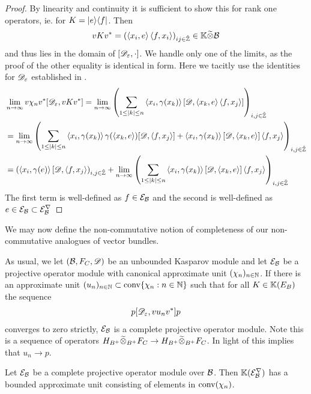\begin{proof}
	By linearity and continuity it is sufficient to show this for rank one operators, ie. for $K=\lvert e \rangle\langle f \rvert$. Then
	\begin{align*}
		vKv^*=(\left \langle x_i,e \right \rangle\left \langle f,x_i \right \rangle)_{ij\in \hat{\mathbb{Z}}}\in \mathbb{K}\widetilde{\otimes} \mathcal{B}
	\end{align*}
	and thus lies in the domain of $[\mathscr{D}_\varepsilon,\cdot]$. We handle only one of the limits, as the proof of the other equality is identical in form. Here we tacitly use the identities for $\mathscr{D}_\varepsilon$ established in .
	\begin{align*}
		&\lim_{n\to \infty} v\chi_nv^* [\mathscr{D}_\varepsilon,vKv^*]=\lim_{n\to \infty} \left ( \sum_{1\leq |k|\leq n}\left \langle x_i,\gamma(x_k) \right \rangle[\mathscr{D},\left \langle x_k,e \right \rangle\left \langle f,x_j \right \rangle] \right )_{i,j\in \hat{\mathbb{Z}}} \\ 
		&=\lim_{n\to \infty} \left ( \sum_{1\leq |k|\leq n } \left \langle x_i,\gamma(x_k) \right \rangle\gamma(\left \langle x_k,e \right \rangle)[\mathscr{D},\left \langle f,x_j \right \rangle]+\left \langle x_i,\gamma(x_k) \right \rangle[\mathscr{D},\left \langle x_k,e \right \rangle]\left \langle f,x_j \right \rangle \right )_{i,j\in \hat{\mathbb{Z}}} \\		
		&=(\left \langle x_i,\gamma(e) \right \rangle[\mathscr{D},\left \langle f,x_j \right \rangle)_{i,j \in \hat{\mathbb{Z}}} +\lim_{n\to \infty} \left ( \sum_{1\leq |k|\leq n} \left \langle x_i,\gamma(x_k) \right \rangle[\mathscr{D},\left \langle x_k,e \right \rangle]\left \langle f,x_j \right \rangle \right )_{i,j\in \hat{\mathbb{Z}}}
	\end{align*}
	The first term is well-defined as $f\in \mathcal{E}_{\mathcal{B}}$ and the second is well-defined as $e\in \mathcal{E}_{\mathcal{B}} \subset \mathcal{E}_{\mathcal{B}}^\nabla$
\end{proof}
We may now define the non-commutative notion of completeness of our non-commutative analogues of vector bundles. 
\begin{definition}
	As usual, we let $(\mathcal{B},F_C,\mathscr{D})$ be an unbounded Kasparov module and let $\mathcal{E}_{\mathcal{B}}$ be a projective operator module with canonical approximate unit $(\chi_n)_{n\in \mathbb{N}}$. 
	If there is an approximate unit $(u_n)_{n\in \mathbb{N}}\subset \operatorname{conv}\{\chi_n: n\in \mathbb{N} \}$ such that for all $K\in \mathbb{K}(E_B)$ the sequence 
	\begin{align*}
		p[\mathscr{D}_\varepsilon,vu_nv^*]p
	\end{align*}
	converges to zero strictly, $\mathcal{E}_{\mathcal{B}}$ is a complete projective operator module. 
	Note this is a sequence of operators $H_{B^+}\widetilde{\otimes}_{B^+} F_C\to H_{B^+}\widetilde{\otimes}_{B^+} F_C$. In light of  this implies that $u_n\to p$.
\end{definition}
\begin{lemma}
	Let $\mathcal{E}_{\mathcal{B}}$ be a complete projective operator module over $\mathcal{B}$. Then $\mathbb{K}(\mathcal{E}^\nabla_{\mathcal{B}})$ has a bounded approximate unit consisting of elements in $\operatorname{conv}(\chi_n)$. 
\end{lemma}
